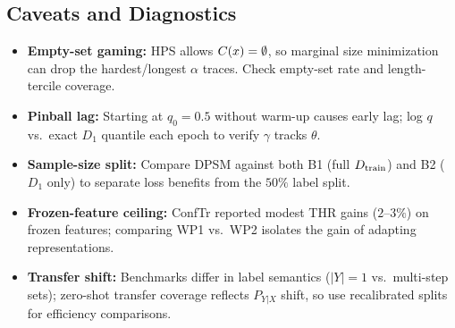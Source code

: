 \documentclass[10pt,a4paper]{article}
\begin{document}
\subsection{Caveats and Diagnostics}
\begin{itemize}
\item \textbf{Empty-set gaming:} HPS allows $C(x)=\emptyset$, so marginal size minimization can drop the hardest/longest $\alpha$ traces. Check empty-set rate and length-tercile coverage.
\item \textbf{Pinball lag:} Starting at $q_0=0.5$ without warm-up causes early lag; log $q$ vs.\ exact $D_1$ quantile each epoch to verify $\gamma$ tracks $\theta$.
\item \textbf{Sample-size split:} Compare DPSM against both B1 (full $D_{\mathrm{train}}$) and B2 ($D_1$ only) to separate loss benefits from the $50\%$ label split.
\item \textbf{Frozen-feature ceiling:} ConfTr reported modest THR gains ($2$--$3\%$) on frozen features; comparing WP1 vs.\ WP2 isolates the gain of adapting representations.
\item \textbf{Transfer shift:} Benchmarks differ in label semantics ($|Y|=1$ vs.\ multi-step sets); zero-shot transfer coverage reflects $P_{Y|X}$ shift, so use recalibrated splits for efficiency comparisons.
\end{itemize}
\end{document}
